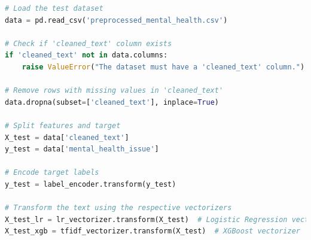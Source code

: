 \begin{tcolorbox}[colback=gray!5!white, colframe=gray!80!black, boxrule=0.5pt, title=Ensemble Model 1 : Data Preparation]
\begin{lstlisting}[language=Python]
# Load the test dataset
data = pd.read_csv('preprocessed_mental_health.csv')

# Check if 'cleaned_text' column exists
if 'cleaned_text' not in data.columns:
    raise ValueError("The dataset must have a 'cleaned_text' column.")

# Remove rows with missing values in 'cleaned_text'
data.dropna(subset=['cleaned_text'], inplace=True)

# Split features and target
X_test = data['cleaned_text']
y_test = data['mental_health_issue']

# Encode target labels
y_test = label_encoder.transform(y_test)

# Transform the text using the respective vectorizers
X_test_lr = lr_vectorizer.transform(X_test)  # Logistic Regression vectorizer
X_test_xgb = tfidf_vectorizer.transform(X_test)  # XGBoost vectorizer
\end{lstlisting}
\end{tcolorbox}
    
